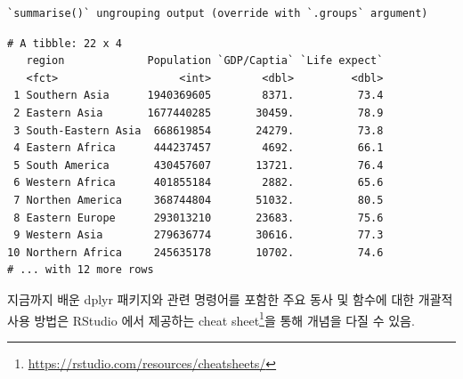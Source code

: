 \documentclass[
  11pt,
]{krantz}
\makeatletter
\newenvironment{Shaded}{\begin{snugshade}}{\end{snugshade}}
\newcommand{\DataTypeTok}[1]{\textcolor[rgb]{0.27,0.27,0.27}{#1}}
\newcommand{\DecValTok}[1]{\textcolor[rgb]{0.06,0.06,0.06}{#1}}
\newcommand{\KeywordTok}[1]{\textcolor[rgb]{0.27,0.27,0.27}{\textbf{#1}}}
\newcommand{\NormalTok}[1]{#1}
\newcommand{\OperatorTok}[1]{\textcolor[rgb]{0.43,0.43,0.43}{\textbf{#1}}}
\newcommand{\OtherTok}[1]{\textcolor[rgb]{0.37,0.37,0.37}{#1}}
\newcommand{\StringTok}[1]{\textcolor[rgb]{0.5,0.5,0.5}{#1}}
\renewcommand{\href}[2]{#2\footnote{\url{#1}}}
\newenvironment{kframe}{%
\medskip{}
\setlength{\fboxsep}{.8em}
 \def\at@end@of@kframe{}%
 \ifinner\ifhmode%
  \def\at@end@of@kframe{\end{minipage}}%
  \begin{minipage}{\columnwidth}%
 \fi\fi%
 \def\FrameCommand##1{\hskip\@totalleftmargin \hskip-\fboxsep
 \colorbox{shadecolor}{##1}\hskip-\fboxsep
     \hskip-\linewidth \hskip-\@totalleftmargin \hskip\columnwidth}%
 \MakeFramed {\advance\hsize-\width
   \@totalleftmargin\z@ \linewidth\hsize
   \@setminipage}}%
 {\par\unskip\endMakeFramed%
 \at@end@of@kframe}
\newenvironment{rmdblock}[1]
  {
  \begin{itemize}
  \renewcommand{\labelitemi}{
    \raisebox{-.7\height}[0pt][0pt]{
      {\setkeys{Gin}{width=3em,keepaspectratio}\texttt{[image: images/\#1]}}
    }
  }
  \setlength{\fboxsep}{1em}
  \begin{kframe}
  \item
  }
  {
  \end{kframe}
  \end{itemize}
  }
\newenvironment{rmdtip}
  {\begin{rmdblock}{tip}}
  {\end{rmdblock}}
\makeatother
\begin{document}
\footnotesize

\begin{Shaded}
\end{Shaded}

\begin{verbatim}
`summarise()` ungrouping output (override with `.groups` argument)
\end{verbatim}

\begin{verbatim}
# A tibble: 22 x 4
   region             Population `GDP/Captia` `Life expect`
   <fct>                   <int>        <dbl>         <dbl>
 1 Southern Asia      1940369605        8371.          73.4
 2 Eastern Asia       1677440285       30459.          78.9
 3 South-Eastern Asia  668619854       24279.          73.8
 4 Eastern Africa      444237457        4692.          66.1
 5 South America       430457607       13721.          76.4
 6 Western Africa      401855184        2882.          65.6
 7 Northen America     368744804       51032.          80.5
 8 Eastern Europe      293013210       23683.          75.6
 9 Western Asia        279636774       30616.          77.3
10 Northern Africa     245635178       10702.          74.6
# ... with 12 more rows
\end{verbatim}

\normalsize

\footnotesize

\begin{rmdtip}
\begin{rmdtip}

지금까지 배운 dplyr 패키지와 관련 명령어를 포함한 주요 동사 및 함수에 대한 개괄적 사용 방법은 RStudio 에서 제공하는 \href{https://rstudio.com/resources/cheatsheets/}{cheat sheet}을 통해 개념을 다질 수 있음.

\end{rmdtip}
\end{rmdtip}
\end{document}
